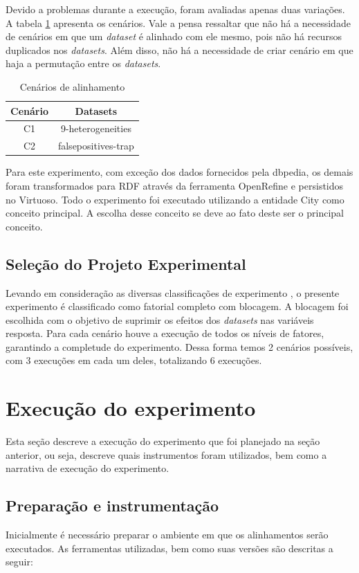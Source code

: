 Devido a problemas durante a execução, foram avaliadas apenas duas variações. A tabela \ref{tab:cenarios} apresenta os cenários. Vale a pensa ressaltar que não há a necessidade de cenários em que um \textit{dataset} é alinhado com ele mesmo, pois não há recursos duplicados nos \textit{datasets}. Além disso, não há a necessidade de criar cenário em que haja a permutação entre os \textit{datasets}.

\begin{table}[h]
\centering
\caption{Cenários de alinhamento}
\label{tab:cenarios}
\begin{tabular}{|c|c|}
\hline
\textbf{Cenário} & \textbf{Datasets}          \\ \hline
C1               & 9-heterogeneities          \\ \hline
C2               & falsepositives-trap        \\ \hline
\end{tabular}
\end{table}

Para este experimento, com exceção dos dados fornecidos pela dbpedia, os demais foram transformados para RDF através da ferramenta OpenRefine e persistidos no Virtuoso.  
Todo o experimento foi executado utilizando a entidade City como conceito principal. A escolha desse conceito se deve ao fato deste ser o principal conceito.

\subsection{Seleção do Projeto Experimental}
Levando em consideração as diversas classificações de experimento \cite{montgomery2012design}, o presente experimento é classificado como fatorial completo com blocagem. A blocagem foi escolhida com o objetivo de suprimir os efeitos dos \textit{datasets} nas variáveis resposta. Para cada cenário houve a execução de todos os níveis de fatores, garantindo a completude do experimento. Dessa forma temos 2 cenários possíveis, com 3 execuções em cada um deles, totalizando 6 execuções.

\section{Execução do experimento}
Esta seção descreve a execução do experimento que foi planejado na seção anterior, ou seja, descreve quais instrumentos foram utilizados, bem como a narrativa de execução do experimento.

\subsection{Preparação e instrumentação}
Inicialmente é necessário preparar o ambiente em que os alinhamentos serão executados. As ferramentas utilizadas, bem como suas versões são descritas a seguir:

